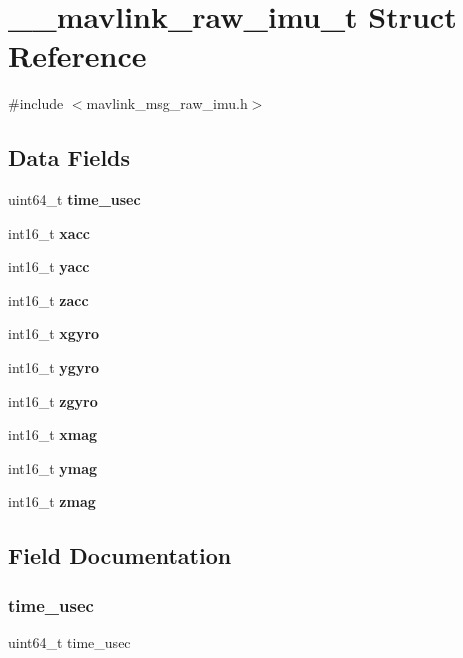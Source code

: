 \section{\+\_\+\+\_\+mavlink\+\_\+raw\+\_\+imu\+\_\+t Struct Reference}
\label{struct____mavlink__raw__imu__t}


{\ttfamily \#include $<$mavlink\+\_\+msg\+\_\+raw\+\_\+imu.\+h$>$}

\subsection*{Data Fields}
\begin{DoxyCompactItemize}
\item 
uint64\+\_\+t \textbf{ time\+\_\+usec}
\item 
int16\+\_\+t \textbf{ xacc}
\item 
int16\+\_\+t \textbf{ yacc}
\item 
int16\+\_\+t \textbf{ zacc}
\item 
int16\+\_\+t \textbf{ xgyro}
\item 
int16\+\_\+t \textbf{ ygyro}
\item 
int16\+\_\+t \textbf{ zgyro}
\item 
int16\+\_\+t \textbf{ xmag}
\item 
int16\+\_\+t \textbf{ ymag}
\item 
int16\+\_\+t \textbf{ zmag}
\end{DoxyCompactItemize}


\subsection{Field Documentation}
\mbox{\label{struct____mavlink__raw__imu__t_a2db60704c293664dcb6159b55c98c2f2}} 
\subsubsection{time\+\_\+usec}
{\footnotesize\ttfamily uint64\+\_\+t time\+\_\+usec}

\mbox{\label{struct____mavlink__raw__imu__t_a962ef46758affd4dcec9a67cb11ed051}} 
